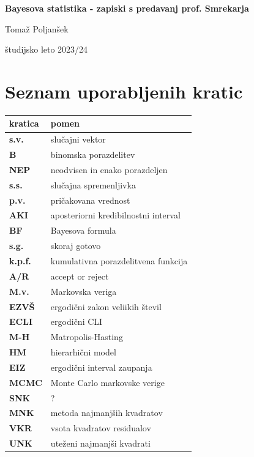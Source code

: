 \documentclass[a4paper, 12pt]{book}
\title{\ttitle}
\author{\tauthor}
\date{\tdate}
\newcommand{\ttitle}{Bayesova statistika - zapiski s predavanj prof. Smrekarja}
\newcommand{\tauthor}{Tomaž Poljanšek}
\newcommand{\tdate}{študijsko leto 2023/24}
\theoremstyle{definition}
\theoremstyle{remark}
\newcommand\mymaketitle{
  \begin{titlepage}
    \begin{center}
        \vspace*{4cm}
        \Huge
        \textbf{\ttitle}
                        
        \vspace{1.5cm}
        \huge
        \tauthor
            
        \vspace{3cm}
        \Large
        \tdate
    \end{center}
  \end{titlepage}
}
\begin{document}
\renewcommand{\thepage}{}
\newcommand{\sn}[1]{"`#1"'}

\mymaketitle

\clearpage
\frontmatter

\pagestyle{empty}
\def\thepage{}
\tableofcontents{}

\def\x{\hspace{3ex}}    %
\def\y{\hspace{2.45ex}}  %
\def\z{\hspace{1.9ex}}    %
\stackMath

\clearpage
{}

\section*{Seznam uporabljenih kratic}

\noindent\begin{tabular}{p{}|p{}}
  {\bf kratica} & {pomen} \\
  \hline
  {\bf s.v.} & {slučajni vektor} \\
  {\bf B} & {binomska porazdelitev} \\
  {\bf NEP} & {neodvisen in enako porazdeljen} \\
  {\bf s.s.} & {slučajna spremenljivka} \\
  {\bf p.v.} & {pričakovana vrednost} \\
  {\bf AKI} & {aposteriorni kredibilnostni interval} \\
  {\bf BF} & {Bayesova formula} \\
  {\bf s.g.} & {skoraj gotovo} \\
  {\bf k.p.f.} & {kumulativna porazdelitvena funkcija} \\
  {\bf A/R} & {accept or reject} \\
  {\bf M.v.} & {Markovska veriga} \\
  {\bf EZVŠ} & {ergodični zakon veliikih števil} \\
  {\bf ECLI} & {ergodični CLI} \\
  {\bf M-H} & {Matropolis-Hasting} \\
  {\bf HM} & {hierarhični model} \\
  {\bf EIZ} & {ergodični interval zaupanja} \\
  {\bf MCMC} & {Monte Carlo markovske verige} \\
  {\bf SNK} & {?} \\
  {\bf MNK} & {metoda najmanjših kvadratov} \\
  {\bf VKR} & {vsota kvadratov residualov} \\
  {\bf UNK} & {uteženi najmanjši kvadrati}
\end{tabular}
\end{document}
